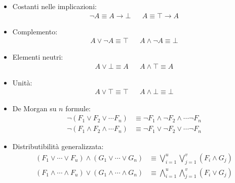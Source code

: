 \begin{itemize}
  \item Costanti nelle implicazioni:
    \begin{align*}
      \neg A \equiv A \rightarrow \bot &&
      A \equiv \top \rightarrow A 
    \end{align*}
  
  \item Complemento:
    \begin{align*}
      A \lor \neg A \equiv \top &&
      A \land \neg A \equiv \bot
    \end{align*}
    
  \item Elementi neutri:
    \begin{align*}
      A \lor \bot \equiv A &&
      A \land \top \equiv A
    \end{align*}
      
  \item Unità:
    \begin{align*}
      A \lor \top  \equiv\top &&
      A \land \bot \equiv \bot
    \end{align*}
    
  \item De Morgan su $n$ formule:
    \begin{align*}
      \neg (F_1 \lor F_2 \lor \cdots F_n) & \equiv \neg F_1 \land \neg F_2 \land \cdots \neg F_n\\
      \neg (F_1 \land F_2 \land \cdots F_n) & \equiv \neg F_1 \lor \neg F_2  \lor \cdots \neg F_n
    \end{align*}
  
  \item  Distributibilità generalizzata:
  \label {def:distributibilita-generalizzata}
    \begin{align*}
      (F_1 \lor \cdots \lor F_u) \land (G_1 \lor \cdots \lor G_n) & \equiv \bigvee\limits_{i = 1}^{u} \bigvee\limits_{j = 1}^{v} (F_i \land G_j) \\
      (F_1 \land \cdots \land F_u) \lor (G_1 \land \cdots \land G_n) & \equiv \bigwedge\limits_{i = 1}^{u} \bigwedge\limits_{j = 1}^{v} (F_i \lor G_j)
    \end{align*}

\end{itemize}

